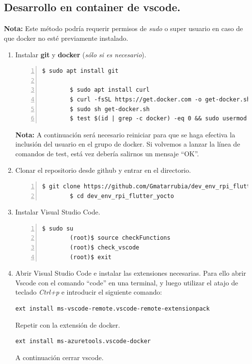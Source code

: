 \subsection{Desarrollo en container de vscode.}

\paragraph{}\textbf{Nota:} Este método podría requerir permisos de \emph{sudo} o super
usuario en caso de que docker no esté previamente instalado.

\begin{enumerate}
    \item Instalar \textbf{\gls{git}} y \textbf{docker} (\emph{sólo si es necesario}).
    \begin{lstlisting}[style=consola, numbers=left]
        $ sudo apt install git

        $ sudo apt install curl
        $ curl -fsSL https://get.docker.com -o get-docker.sh
        $ sudo sh get-docker.sh
        $ test $(id | grep -c docker) -eq 0 && sudo usermod -aG docker $(whoami) || echo "OK"
    \end{lstlisting}
    \textbf{Nota:} A continuación será necesario reiniciar para que se haga efectiva la
    inclusión del usuario en el grupo de docker. Si volvemos a lanzar la línea de
    comandos de test, está vez debería salirnos un mensaje ``OK''.

    \item Clonar el repositorio desde github y entrar en el directorio.
    \begin{lstlisting}[style=consola, numbers=left]
        $ git clone https://github.com/Gmatarrubia/dev_env_rpi_flutter_yocto.git
        $ cd dev_env_rpi_flutter_yocto
    \end{lstlisting}

    \item Instalar Visual Studio Code.
    \begin{lstlisting}[style=consola, numbers=left]
        $ sudo su
        (root)$ source checkFunctions
        (root)$ check_vscode
        (root)$ exit
    \end{lstlisting}

    \item Abrir Visual Studio Code e instalar las extensiones necesarias. Para ello
    abrir Vscode con el comando ``code'' en una terminal, y luego utilizar el atajo de
    teclado \emph{Ctrl+p} e introducir el siguiente comando:
    \begin{lstlisting}[style=cmd]
        ext install ms-vscode-remote.vscode-remote-extensionpack
    \end{lstlisting}
    Repetir con la extensión de docker.
    \begin{lstlisting}[style=cmd]
        ext install ms-azuretools.vscode-docker
    \end{lstlisting}
    A continuación cerrar \gls{vscode}.


\end{enumerate}
